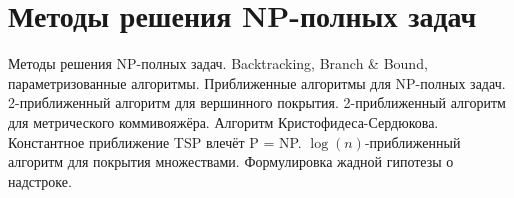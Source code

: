 \section{Методы решения NP-полных задач}
Методы решения NP-полных задач.
Backtracking, Branch \& Bound, параметризованные алгоритмы.
Приближенные алгоритмы для NP-полных задач.
2-приближенный алгоритм для вершинного покрытия.
2-приближенный алгоритм для метрического коммивояжёра.
Алгоритм Кристофидеса-Сердюкова.
Константное приближение TSP влечёт P = NP.
$\log(n)$-приближенный алгоритм для покрытия множествами.
Формулировка жадной гипотезы о надстроке.
